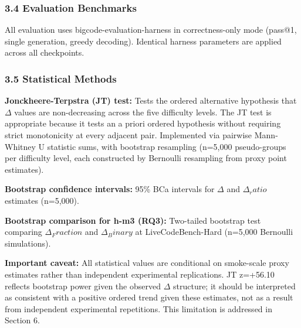 \subsubsection{3.4 Evaluation Benchmarks}

\begin{table}[htbp]
\centering
{}
\end{table}

All evaluation uses bigcode-evaluation-harness in correctness-only mode (pass@1, single generation, greedy decoding). Identical harness parameters are applied across all checkpoints.

\subsubsection{3.5 Statistical Methods}

\textbf{Jonckheere-Terpstra (JT) test:} Tests the ordered alternative hypothesis that $\Delta$ values are non-decreasing across the five difficulty levels. The JT test is appropriate because it tests an a priori ordered hypothesis without requiring strict monotonicity at every adjacent pair. Implemented via pairwise Mann-Whitney U statistic sums, with bootstrap resampling (n=5,000 pseudo-groups per difficulty level, each constructed by Bernoulli resampling from proxy point estimates).

\textbf{Bootstrap confidence intervals:} 95\% BCa intervals for $\Delta$ and $\Delta _ratio$ estimates (n=5,000).

\textbf{Bootstrap comparison for h-m3 (RQ3):} Two-tailed bootstrap test comparing $\Delta _Fraction$ and $\Delta _Binary$ at LiveCodeBench-Hard (n=5,000 Bernoulli simulations).

\textbf{Important caveat:} All statistical values are conditional on smoke-scale proxy estimates rather than independent experimental replications. JT z=+56.10 reflects bootstrap power given the observed $\Delta$ structure; it should be interpreted as consistent with a positive ordered trend given these estimates, not as a result from independent experimental repetitions. This limitation is addressed in Section 6.

